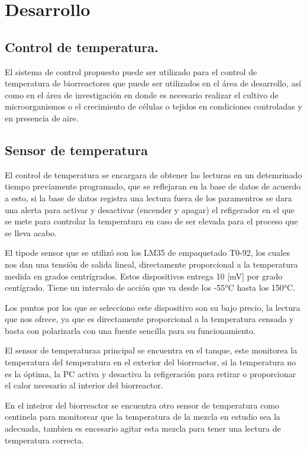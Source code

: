 \documentclass[letter,operight,12pt,spanish]{report}
\begin{document}
\section{Desarrollo}

\subsection{Control de temperatura.}

El sistema de control propuesto puede ser utilizado para el control de temperatura de biorreactores que puede ser utilizados en el \'area de desarrollo, as\'i como en el \'area de investigaci\'on en donde es necesario realizar el cultivo de microorganismos o el crecimiento de c\'elulas o tejidos en condiciones controladas y en presencia de aire.

\subsection{Sensor de temperatura}

El control de temperatura se encargara de obtener las lecturas en un detemrinado tiempo previamente programado,  que se reflejaran en la base de datos de acuerdo a esto, si la base de datos registra una lectura fuera de los paramentros se dara una alerta para activar y desactivar (encender y apagar) el refigerador en el que se mete para controlar la temperatura en caso de ser elevada para el proceso que se lleva acabo.

El tipode sensor que se utiliz\'o son los LM35 de empaquetado T0-92, los cuales nos dan una tensi\'on de salida lineal, directamente proporcional a la temperatura  medida en grados centr\'igrados. Estos dispositivos entrega 10 [mV] por grado cent\'igrado. Tiene un intervalo de acci\'on que va desde los -55°C hasta los 150°C.

Los puntos por los que se selecciono este dispositivo son su bajo precio, la lectura que nos ofrece, ya que es directamente proporcional a la temperatura censada y basta con polarizarla con una fuente sencilla para su funcionamiento.

El sensor de temperaturaa principal se encuentra en el tanque, este monitorea la temperatura del temperatura en el exterior del biorreactor, si la temperatura no es la \'optima, la PC activa y desactiva la refigeraci\'on para retirar o proporcionar el calor necesario al interior del biorreactor.

En el inteiror del biorreactor se encuentra otro sensor de temperatura como centinela para monitorear que la temperatura de la mezcla en estudio sea la adecuada, tambien es encesario agitar esta mezcla para tener una lectura de temperatura correcta.
\end{document}
